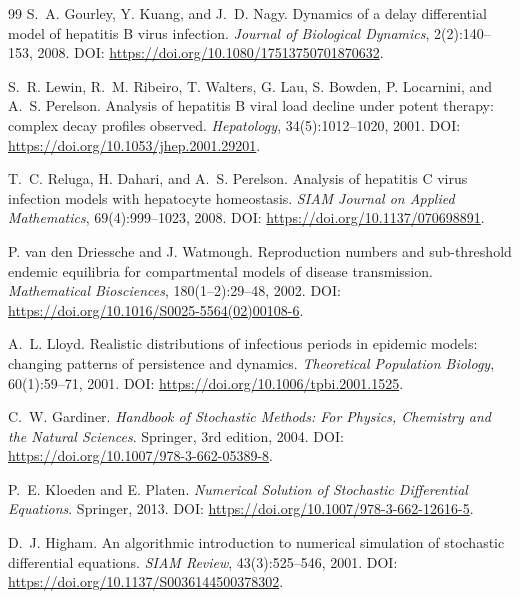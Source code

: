 \documentclass{article}
\begin{document}
\begin{thebibliography}{99}
S.~A. Gourley, Y. Kuang, and J.~D. Nagy.
\newblock Dynamics of a delay differential model of hepatitis B virus infection.
\newblock \emph{Journal of Biological Dynamics}, 2(2):140--153, 2008. DOI: \url{https://doi.org/10.1080/17513750701870632}.

S.~R. Lewin, R.~M. Ribeiro, T. Walters, G. Lau, S. Bowden, P. Locarnini, and A.~S. Perelson.
\newblock Analysis of hepatitis B viral load decline under potent therapy: complex decay profiles observed.
\newblock \emph{Hepatology}, 34(5):1012--1020, 2001. DOI: \url{https://doi.org/10.1053/jhep.2001.29201}.

T.~C. Reluga, H. Dahari, and A.~S. Perelson.
\newblock Analysis of hepatitis C virus infection models with hepatocyte homeostasis.
\newblock \emph{SIAM Journal on Applied Mathematics}, 69(4):999--1023, 2008. DOI: \url{https://doi.org/10.1137/070698891}.

P. van den Driessche and J. Watmough.
\newblock Reproduction numbers and sub-threshold endemic equilibria for compartmental models of disease transmission.
\newblock \emph{Mathematical Biosciences}, 180(1--2):29--48, 2002. DOI: \url{https://doi.org/10.1016/S0025-5564(02)00108-6}.

A.~L. Lloyd.
\newblock Realistic distributions of infectious periods in epidemic models: changing patterns of persistence and dynamics.
\newblock \emph{Theoretical Population Biology}, 60(1):59--71, 2001. DOI: \url{https://doi.org/10.1006/tpbi.2001.1525}.

C.~W. Gardiner.
\newblock \emph{Handbook of Stochastic Methods: For Physics, Chemistry and the Natural Sciences}.
\newblock Springer, 3rd edition, 2004. DOI: \url{https://doi.org/10.1007/978-3-662-05389-8}.

P.~E. Kloeden and E. Platen.
\newblock \emph{Numerical Solution of Stochastic Differential Equations}.
\newblock Springer, 2013. DOI: \url{https://doi.org/10.1007/978-3-662-12616-5}.

D.~J. Higham.
\newblock An algorithmic introduction to numerical simulation of stochastic differential equations.
\newblock \emph{SIAM Review}, 43(3):525--546, 2001. DOI: \url{https://doi.org/10.1137/S0036144500378302}.


\end{thebibliography}
\end{document}
